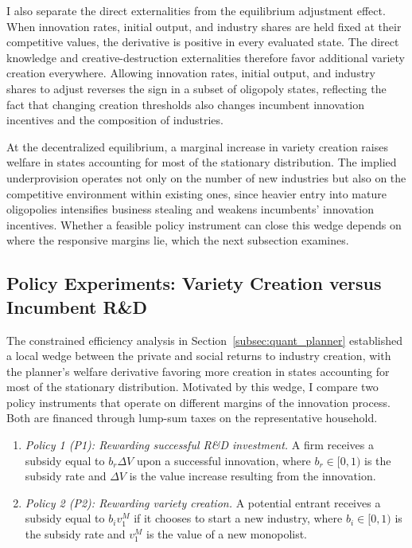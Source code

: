 \documentclass[12pt]{article}
\begin{document}
I also separate the direct externalities from the equilibrium adjustment effect. When innovation rates, initial output, and industry shares are held fixed at their competitive values, the derivative is positive in every evaluated state. The direct knowledge and creative-destruction externalities therefore favor additional variety creation everywhere. Allowing innovation rates, initial output, and industry shares to adjust reverses the sign in a subset of oligopoly states, reflecting the fact that changing creation thresholds also changes incumbent innovation incentives and the composition of industries.

At the decentralized equilibrium, a marginal increase in variety creation raises welfare in states accounting for most of the stationary distribution. The implied underprovision operates not only on the number of new industries but also on the competitive environment within existing ones, since heavier entry into mature oligopolies intensifies business stealing and weakens incumbents' innovation incentives. Whether a feasible policy instrument can close this wedge depends on where the responsive margins lie, which the next subsection examines.

\subsection{Policy Experiments: Variety Creation versus Incumbent R\&D}\label{subsec:policy}

The constrained efficiency analysis in Section~\ref{subsec:quant_planner} established a local wedge between the private and social returns to industry creation, with the planner's welfare derivative favoring more creation in states accounting for most of the stationary distribution. Motivated by this wedge, I compare two policy instruments that operate on different margins of the innovation process. Both are financed through lump-sum taxes on the representative household.
\begin{enumerate}
    \item \emph{Policy 1 (P1): Rewarding successful R\&D investment.} A firm receives a subsidy equal to \(b_r \Delta V\) upon a successful innovation, where \(b_r \in [0,1)\) is the subsidy rate and \(\Delta V\) is the value increase resulting from the innovation.
    \item \emph{Policy 2 (P2): Rewarding variety creation.} A potential entrant receives a subsidy equal to \(b_i v^M_1\) if it chooses to start a new industry, where \(b_i \in [0,1)\) is the subsidy rate and \(v^M_1\) is the value of a new monopolist.
\end{enumerate}
\end{document}
